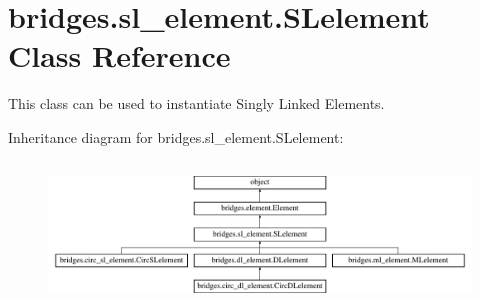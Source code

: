 \hypertarget{classbridges_1_1sl__element_1_1_s_lelement}{}\section{bridges.\+sl\+\_\+element.\+S\+Lelement Class Reference}
\label{classbridges_1_1sl__element_1_1_s_lelement}


This class can be used to instantiate Singly Linked Elements.  


Inheritance diagram for bridges.\+sl\+\_\+element.\+S\+Lelement\+:\begin{figure}[H]
\begin{center}
\leavevmode
\includegraphics[height=3.856750cm]{classbridges_1_1sl__element_1_1_s_lelement}
\end{center}
\end{figure}
